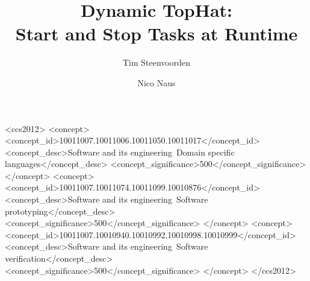 \documentclass[review]{acmart}
\begin{document}
\title[Dynamic TopHat]{Dynamic TopHat:\\ Start and Stop Tasks at Runtime}

\author{Tim Steenvoorden}

\author{Nico Naus}

\renewcommand{\shortauthors}{Steenvoorden and Naus}

\begin{abstract}


\end{abstract}

\begin{CCSXML}
<ccs2012>
   <concept>
       <concept_id>10011007.10011006.10011050.10011017</concept_id>
       <concept_desc>Software and its engineering~Domain specific languages</concept_desc>
       <concept_significance>500</concept_significance>
       </concept>
   <concept>
       <concept_id>10011007.10011074.10011099.10010876</concept_id>
       <concept_desc>Software and its engineering~Software prototyping</concept_desc>
       <concept_significance>500</concept_significance>
       </concept>
   <concept>
       <concept_id>10011007.10010940.10010992.10010998.10010999</concept_id>
       <concept_desc>Software and its engineering~Software verification</concept_desc>
       <concept_significance>500</concept_significance>
       </concept>
 </ccs2012>
\end{CCSXML}
\end{document}
